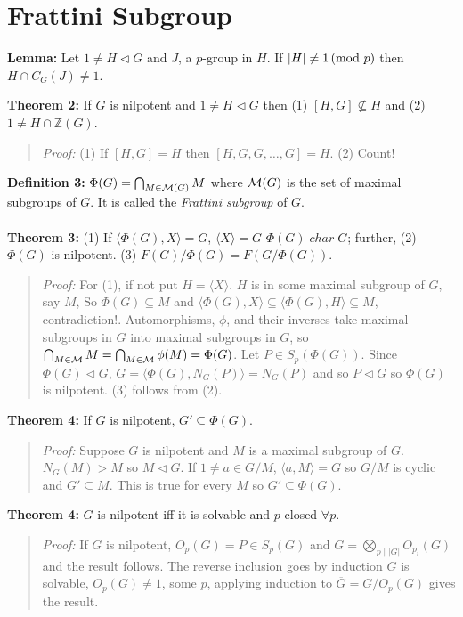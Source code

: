\section{Frattini Subgroup}
{\bf Lemma:} Let $1 \ne H \lhd G$ and $J$, a $p$-group in $H$.  If $|H| \neq 1 \thinspace \textnormal{(mod } p \textnormal{)}$ then
$H \cap C_G(J) \neq 1$.
\begin{quote}
\end{quote}
{\bf Theorem 2:} If $G$ is nilpotent and $1 \ne H \lhd G$ then (1) $[H,G] \nsubseteq H$ and
(2) $1 \ne H \cap {\mathbb Z}(G)$.
\begin{quote}
\emph{Proof:} (1) If $[H,G]=H$ then $[H, G, G, \ldots, G]=H$. (2) Count!
\end{quote}
{\bf Definition 3:} $\Phi(G)= \bigcap_{M \in {\cal M}(G)} M$ where ${\cal M}(G)$ is the set of
maximal subgroups of $G$.  
It is called the \emph {Frattini subgroup} of $G$.  
\\
\\
{\bf Theorem 3:} 
(1) If $\langle \Phi(G), X \rangle = G$, $\langle X \rangle = G$
$\Phi(G) \; char \; G$; further,
(2) $\Phi(G)$ is nilpotent. (3)
$F(G)/\Phi(G)= F(G/\Phi(G))$.
\begin{quote}
\emph{Proof:}  
For (1), if not put $H=\langle X \rangle$.  $H$ is in some maximal subgroup of $G$, say $M$,
So $\Phi(G) \subseteq M$ and $\langle \Phi(G), X \rangle \subseteq \langle \Phi(G), H \rangle \subseteq M$,
contradiction!.
Automorphisms, $\phi$, and their inverses take maximal subgroups in $G$ into
maximal subgroups in $G$, so 
$ \bigcap_{M \in {\cal M}} M = \bigcap_{M \in {\cal M}} \phi(M)= \Phi(G)$.
Let $P \in S_p(\Phi(G))$.  Since $\Phi(G) \lhd G$, $G= \langle \Phi(G), N_G(P) \rangle = N_G(P)$ and so
$P \lhd G$ so $\Phi(G)$ is nilpotent.  (3) follows from (2).
\end{quote}
{\bf Theorem 4:} If $G$ is nilpotent, $G' \subseteq \Phi(G)$.
\begin{quote}
\emph{Proof:}  Suppose $G$ is nilpotent and $M$ is a maximal subgroup of $G$.
$N_G(M)>M$ so $M \lhd G$.  If $1 \ne a \in G/M$, $ \langle a, M \rangle = G$ so $G/M$ is cyclic and
$G' \subseteq M$.  This is true for every $M$ so $G' \subseteq \Phi(G)$.
\end{quote}
{\bf Theorem 4:} $G$ is nilpotent iff it is solvable and $p$-closed $\forall p$.
\begin{quote}
\emph{Proof:} If $G$ is nilpotent, $O_p(G) = P \in S_p(G)$ and $G= \bigotimes_{p \mid |G|} O_{p_i}(G)$ and the result follows.
The reverse inclusion goes by induction $G$ is solvable, $O_p(G) \neq 1$, some $p$, applying induction to ${\overline G}=
G/O_p(G)$ gives the result.
\end{quote}
